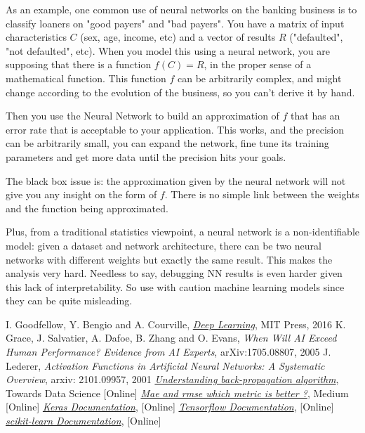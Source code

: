 As an example, one common use of neural networks on the banking business is to classify loaners on "good payers" and "bad payers". You have a matrix of input characteristics $C$ (sex, age, income, etc) and a vector of results $R$ ("defaulted", "not defaulted", etc). When you model this using a neural network, you are supposing that there is a function $f(C)=R$, in the proper sense of a mathematical function. This function $f$ can be arbitrarily complex, and might change according to the evolution of the business, so you can't derive it by hand.

Then you use the Neural Network to build an approximation of $f$ that has an error rate that is acceptable to your application. This works, and the precision can be arbitrarily small, you can expand the network, fine tune its training parameters and get more data until the precision hits your goals.

The black box issue is: the approximation given by the neural network will not give you any insight on the form of $f$. There is no simple link between the weights and the function being approximated. 

Plus, from a traditional statistics viewpoint, a neural network is a non-identifiable model: given a dataset and network architecture, there can be two neural networks with different weights but exactly the same result. This makes the analysis very hard.
Needless to say, debugging NN results is even harder given this lack of interpretability. So use with caution machine learning models since they can be quite misleading.
 
\begin{thebibliography}{9}
 I. Goodfellow, Y. Bengio and A. Courville, \href{http://www.deeplearningbook.org}{\emph{Deep Learning}}, MIT Press, 2016
K. Grace, J. Salvatier, A. Dafoe, B. Zhang and O. Evans, \emph{When Will AI Exceed Human Performance? Evidence from AI Experts}, arXiv:1705.08807, 2005
 J. Lederer, \emph{Activation Functions in Artificial Neural Networks: A Systematic Overview}, arxiv: 2101.09957, 2001
\href{https://towardsdatascience.com/understanding-backpropagation-algorithm-7bb3aa2f95fd}{\emph{Understanding back-propagation algorithm}}, Towards Data Science [Online]
\href{https://medium.com/human-in-a-machine-world/mae-and-rmse-which-metric-is-better-e60ac3bde13d}{\emph{Mae and rmse which metric is better ?}}, Medium [Online]
\href{https://keras.io/}{\emph{Keras Documentation}}, [Online]  
\href{https://www.tensorflow.org/}{\emph{Tensorflow Documentation}}, [Online] 
\href{https://scikit-learn.org/stable/}{\emph{scikit-learn Documentation}}, [Online]
\end{thebibliography}